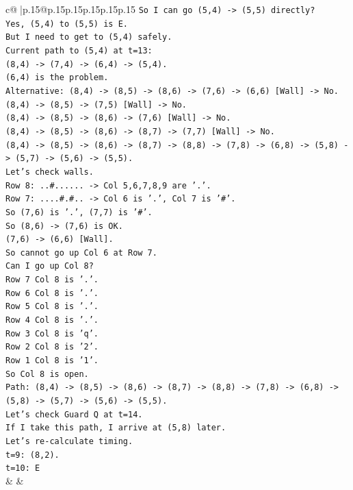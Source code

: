 \documentclass{article}
\begin{document}
{\begin{supertabular}{c@{$\;$}|p{.15\linewidth}@{}p{.15\linewidth}p{.15\linewidth}p{.15\linewidth}p{.15\linewidth}p{.15\linewidth}}
{{{\texttt{So I can go (5,4) {-}> (5,5) directly?} \\
\texttt{Yes, (5,4) to (5,5) is E.} \\
\texttt{But I need to get to (5,4) safely.} \\
\texttt{Current path to (5,4) at t=13:} \\
\texttt{(8,4) {-}> (7,4) {-}> (6,4) {-}> (5,4).} \\
\texttt{(6,4) is the problem.} \\
\texttt{Alternative: (8,4) {-}> (8,5) {-}> (8,6) {-}> (7,6) {-}> (6,6) {[}Wall{]} {-}> No.} \\
\texttt{(8,4) {-}> (8,5) {-}> (7,5) {[}Wall{]} {-}> No.} \\
\texttt{(8,4) {-}> (8,5) {-}> (8,6) {-}> (7,6) {[}Wall{]} {-}> No.} \\
\texttt{(8,4) {-}> (8,5) {-}> (8,6) {-}> (8,7) {-}> (7,7) {[}Wall{]} {-}> No.} \\
\texttt{(8,4) {-}> (8,5) {-}> (8,6) {-}> (8,7) {-}> (8,8) {-}> (7,8) {-}> (6,8) {-}> (5,8) {-}> (5,7) {-}> (5,6) {-}> (5,5).} \\
\texttt{Let's check walls.} \\
\texttt{Row 8: ..\#...... {-}> Col 5,6,7,8,9 are '.'.} \\
\texttt{Row 7: ....\#.\#.. {-}> Col 6 is '.', Col 7 is '\#'.} \\
\texttt{So (7,6) is '.', (7,7) is '\#'.} \\
\texttt{So (8,6) {-}> (7,6) is OK.} \\
\texttt{(7,6) {-}> (6,6) {[}Wall{]}.} \\
\texttt{So cannot go up Col 6 at Row 7.} \\
\texttt{Can I go up Col 8?} \\
\texttt{Row 7 Col 8 is '.'.} \\
\texttt{Row 6 Col 8 is '.'.} \\
\texttt{Row 5 Col 8 is '.'.} \\
\texttt{Row 4 Col 8 is '.'.} \\
\texttt{Row 3 Col 8 is 'q'.} \\
\texttt{Row 2 Col 8 is '2'.} \\
\texttt{Row 1 Col 8 is '1'.} \\
\texttt{So Col 8 is open.} \\
\texttt{Path: (8,4) {-}> (8,5) {-}> (8,6) {-}> (8,7) {-}> (8,8) {-}> (7,8) {-}> (6,8) {-}> (5,8) {-}> (5,7) {-}> (5,6) {-}> (5,5).} \\
\texttt{Let's check Guard Q at t=14.} \\
\texttt{If I take this path, I arrive at (5,8) later.} \\
\texttt{Let's re{-}calculate timing.} \\
\texttt{t=9: (8,2).} \\
\texttt{t=10: E} \\
            }
        }
    }
    & & \\ \\


\end{supertabular}}
\end{document}
